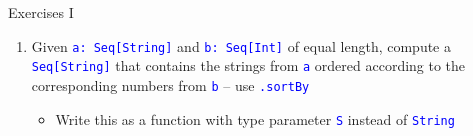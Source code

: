 \documentclass[english]{beamer}
\begin{document}
\begin{frame}{Exercises I}
\begin{enumerate}
\begin{itemize}
and \texttt{\textcolor{blue}{\footnotesize{}I}} instead of the fixed
types \texttt{\textcolor{blue}{\footnotesize{}String}} and \texttt{\textcolor{blue}{\footnotesize{}Int}};
test it with \texttt{\textcolor{blue}{\footnotesize{}S=Boolean}} and
\texttt{\textcolor{blue}{\footnotesize{}I=Set{[}Int{]}}}{\footnotesize\par}
\end{itemize}
\item Given \texttt{\textcolor{blue}{\footnotesize{}a:}}~\texttt{\textcolor{blue}{\footnotesize{}Seq{[}String{]}}}
and \texttt{\textcolor{blue}{\footnotesize{}b:}}~\texttt{\textcolor{blue}{\footnotesize{}Seq{[}Int{]}}}
of equal length, compute a \texttt{\textcolor{blue}{\footnotesize{}Seq{[}String{]}}}
that contains the strings from \texttt{\textcolor{blue}{\footnotesize{}a}}
ordered according to the corresponding numbers from \texttt{\textcolor{blue}{\footnotesize{}b}}
-- use \texttt{\textcolor{blue}{\footnotesize{}.sortBy}}{\footnotesize\par}
\begin{itemize}
\item Write this as a function with type parameter \texttt{\textcolor{blue}{\footnotesize{}S}}
instead of \texttt{\textcolor{blue}{\footnotesize{}String}}{\footnotesize\par}
\end{itemize}
\end{enumerate}
\end{frame}
\end{document}
